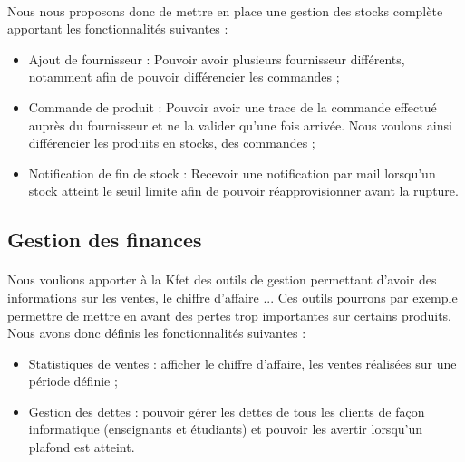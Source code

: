 \documentclass[twoside,UTF8]{EPURapport}
\begin{document}
            \paragraph{}Nous nous proposons donc de mettre en place une gestion des stocks complète apportant les fonctionnalités suivantes :\\
            \begin{itemize}
                \item Ajout de fournisseur : Pouvoir avoir plusieurs fournisseur différents, notamment afin de pouvoir différencier les commandes ;\\
                \item Commande de produit : Pouvoir avoir une trace de la commande effectué auprès du fournisseur et ne la valider qu'une fois arrivée. Nous voulons ainsi différencier les produits en stocks, des commandes ;\\
                \item Notification de fin de stock : Recevoir une notification par mail lorsqu'un stock atteint le seuil limite afin de pouvoir réapprovisionner avant la rupture.\\
            \end{itemize}

        \subsection{Gestion des finances}

            \paragraph{}Nous voulions apporter à la Kfet des outils de gestion permettant d'avoir des informations sur les ventes, le chiffre d'affaire ... Ces outils pourrons par exemple permettre de mettre en avant des pertes trop importantes sur certains produits. Nous avons donc définis les fonctionnalités suivantes :\\

            \begin{itemize}
                \item Statistiques de ventes : afficher le chiffre d'affaire, les ventes réalisées sur une période définie ;\\
                \item Gestion des dettes : pouvoir gérer les dettes de tous les clients de façon informatique (enseignants et étudiants) et pouvoir les avertir lorsqu'un plafond est atteint.
            \end{itemize}
\end{document}
